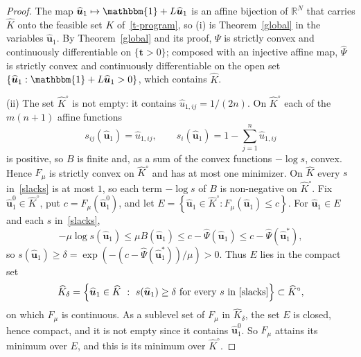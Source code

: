 \documentclass[11pt]{article}
\theoremstyle{plain}
\theoremstyle{definition}
\theoremstyle{remark}
\numberwithin{equation}{section}
\numberwithin{figure}{section}
\numberwithin{table}{section}
\begin{document}
\begin{proof}
The map $\widehat{\bm u}_1\mapsto\mathbbm{1}+L\widehat{\bm u}_1$ is an affine
bijection of $\mathbb{R}^N$ that carries $\widehat K$ onto the feasible set
$K$ of~\eqref{t-program}, so (i) is Theorem~\ref{global} in the variables
$\widehat{\bm u}_1$. By Theorem~\ref{global} and its proof, $\Psi$ is strictly
convex and continuously differentiable on $\{\bm t>0\}$; composed with an
injective affine map, $\widehat\Psi$ is strictly convex and continuously
differentiable on the open set $\left\{\widehat{\bm u}_1:\mathbbm{1}+L\widehat{\bm u}_1>0\right\}$,
which contains $\widehat K$.

(ii) The set $\widehat K^\circ$ is not empty: it contains $\widehat u_{1,ij}=1/(2n)$.
On $\widehat K^\circ$ each of the $m(n+1)$ affine functions
\begin{equation}\label{slacks}
s_{ij}(\widehat{\bm u}_1)=\widehat u_{1,ij},\qquad
s_{i}(\widehat{\bm u}_1)=1-\sum_{j=1}^{n}\widehat u_{1,ij}
\end{equation}
is positive, so $B$ is finite and, as a sum of the convex functions $-\log s$,
convex. Hence $F_\mu$ is strictly convex on $\widehat K^\circ$ and has at most one
minimizer. On $\widehat K$ every $s$ in~\eqref{slacks} is at most $1$, so each term
$-\log s$ of $B$ is non-negative on $\widehat K^\circ$. Fix $\widehat{\bm u}_1^0\in \widehat K^\circ$,
put $c=F_\mu(\widehat{\bm u}_1^0)$, and let
$E=\left\{\widehat{\bm u}_1\in \widehat K^\circ: F_\mu(\widehat{\bm u}_1)\le c\right\}$.
For $\widehat{\bm u}_1\in E$ and each $s$ in~\eqref{slacks},
\begin{equation}
-\mu\log s(\widehat{\bm u}_1)\le\mu B(\widehat{\bm u}_1)
\le c-\widehat\Psi(\widehat{\bm u}_1)\le c-\widehat\Psi(\widehat{\bm u}_1^*),
\end{equation}
so $s(\widehat{\bm u}_1)\ge\delta=\exp\left(-\left(c-\widehat\Psi(\widehat{\bm u}_1^*)\right)/\mu\right)>0$.
Thus $E$ lies in the compact set
\begin{equation}
\widehat K_\delta=\left\{\widehat{\bm u}_1\in\widehat K\ :\ s(\widehat{\bm u}_1)\ge\delta\
\mbox{for every $s$ in~\eqref{slacks}}\right\}\subset \widehat K^\circ,
\end{equation}
on which $F_\mu$ is continuous. As a sublevel set of $F_\mu$ in $\widehat K_\delta$, the
set $E$ is closed, hence compact, and it is not empty since it contains
$\widehat{\bm u}_1^0$. So $F_\mu$ attains its minimum over $E$, and this is its
minimum over $\widehat K^\circ$.


\end{proof}
\end{document}
